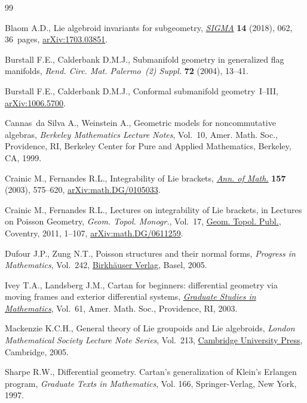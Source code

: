\documentclass[pdftex]{sigma}%
\numberwithin{equation}{section}
\begin{document}
\begin{thebibliography}{99}
\footnotesize\itemsep=0pt

Blaom A.D., Lie algebroid invariants for subgeometry, \href{https://doi.org/10.3842/SIGMA.2018.062}{\textit{SIGMA}}
 \textbf{14} (2018), 062, 36~pages, \href{https://arxiv.org/abs/1703.03851}{arXiv:1703.03851}.

Burstall F.E., Calderbank D.M.J., Submanifold geometry in generalized flag
 manifolds, \textit{Rend. Circ. Mat. Palermo~(2) Suppl.} \textbf{72} (2004),
 13--41.

Burstall F.E., Calderbank D.M.J., Conformal submanifold geometry~{I}--{III},
 \href{https://arxiv.org/abs/1006.5700}{arXiv:1006.5700}.

Cannas~da Silva A., Weinstein A., Geometric models for noncommutative algebras,
 \textit{Berkeley Mathematics Lecture Notes}, Vol.~10, Amer. Math. Soc.,
 Providence, RI, Berkeley Center for Pure and Applied Mathematics, Berkeley,
 CA, 1999.

Crainic M., Fernandes R.L., Integrability of {L}ie brackets, \href{https://doi.org/10.4007/annals.2003.157.575}{\textit{Ann. of
 Math.}} \textbf{157} (2003), 575--620, \href{https://arxiv.org/abs/math.DG/0105033}{arXiv:math.DG/0105033}.

Crainic M., Fernandes R.L., Lectures on integrability of {L}ie brackets, in
 Lectures on {P}oisson Geometry, \textit{Geom. Topol. Monogr.}, Vol.~17, \href{https://doi.org/10.2140/gt}{Geom.
 Topol. Publ.}, Coventry, 2011, 1--107, \href{https://arxiv.org/abs/math.DG/0611259}{arXiv:math.DG/0611259}.

Dufour J.P., Zung N.T., Poisson structures and their normal forms,
 \textit{Progress in Mathematics}, Vol.~242, \href{https://doi.org/10.1007/b137493}{Birkh\"auser Verlag}, Basel, 2005.

Ivey T.A., Landsberg J.M., Cartan for beginners: differential geometry via
 moving frames and exterior differential systems, \href{https://doi.org/10.1090/gsm/061}{\textit{Graduate Studies in
 Mathematics}}, Vol.~61, Amer. Math. Soc., Providence, RI, 2003.

Mackenzie K.C.H., General theory of {L}ie groupoids and {L}ie algebroids,
 \textit{London Mathematical Society Lecture Note Series}, Vol.~213, \href{https://doi.org/10.1017/CBO9781107325883}{Cambridge
 University Press}, Cambridge, 2005.

Sharpe R.W., Differential geometry. {C}artan's generalization of {K}lein's
 {E}rlangen program, \textit{Graduate Texts in Mathematics}, Vol. 166,
 Springer-Verlag, New York, 1997.

\end{thebibliography}\LastPageEnding
\end{document}
